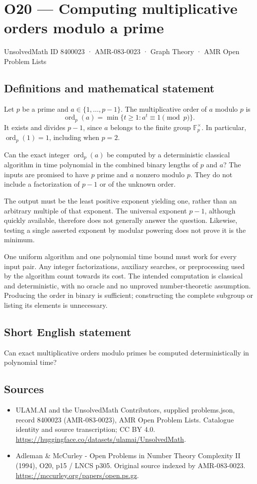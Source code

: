 \documentclass[11pt,a4paper]{article}
\begin{document}
\section*{O20 — Computing multiplicative orders modulo a prime}\label{8400023}
{\small UnsolvedMath ID 8400023 · AMR-083-0023 · Graph Theory · AMR Open Problem Lists}
\subsection{Definitions and mathematical statement}
Let $p$ be a prime and $a\in\{1,\ldots,p-1\}$. The multiplicative order of $a$ modulo $p$ is
\[
\operatorname{ord}_p(a)=\min\{t\ge1:a^t\equiv1\pmod p\}.
\]
It exists and divides $p-1$, since $a$ belongs to the finite group $\mathbb F_p^\times$. In particular, $\operatorname{ord}_p(1)=1$, including when $p=2$.

Can the exact integer $\operatorname{ord}_p(a)$ be computed by a deterministic classical algorithm in time polynomial in the combined binary lengths of $p$ and $a$? The inputs are promised to have $p$ prime and $a$ nonzero modulo $p$. They do not include a factorization of $p-1$ or of the unknown order.

The output must be the least positive exponent yielding one, rather than an arbitrary multiple of that exponent. The universal exponent $p-1$, although quickly available, therefore does not generally answer the question. Likewise, testing a single asserted exponent by modular powering does not prove it is the minimum.

One uniform algorithm and one polynomial time bound must work for every input pair. Any integer factorizations, auxiliary searches, or preprocessing used by the algorithm count towards its cost. The intended computation is classical and deterministic, with no oracle and no unproved number-theoretic assumption. Producing the order in binary is sufficient; constructing the complete subgroup or listing its elements is unnecessary.
\subsection{Short English statement}
Can exact multiplicative orders modulo primes be computed deterministically in polynomial time?
\subsection{Sources}
\begin{itemize}
\item[S1] ULAM.AI and the UnsolvedMath Contributors, supplied problems.json, record 8400023 (AMR-083-0023), AMR Open Problem Lists. Catalogue identity and source transcription; CC BY 4.0.
\url{https://huggingface.co/datasets/ulamai/UnsolvedMath}.
\item[S2] Adleman \& McCurley - Open Problems in Number Theory Complexity II (1994), O20, p15 / LNCS p305. Original source indexed by AMR-083-0023.
\url{https://mccurley.org/papers/open.ps.gz}.
\end{itemize}
\end{document}
